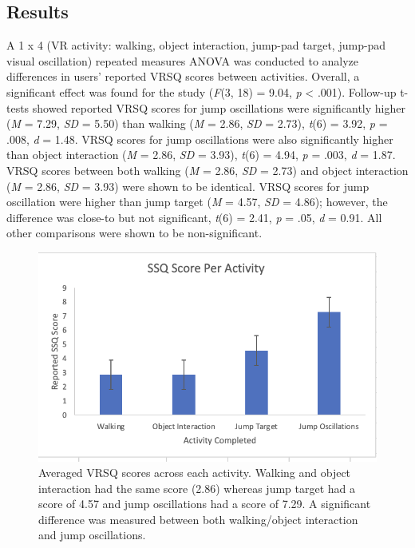 \documentclass[sigconf]{acmart}
\begin{document}
\subsection{Results}
A 1 x 4 (VR activity: walking, object interaction, jump-pad target, jump-pad visual oscillation) repeated measures ANOVA was conducted to analyze differences in users' reported VRSQ scores between activities. Overall, a significant effect was found for the study (\textit{F}(3, 18) = 9.04, \textit{p} < .001). Follow-up t-tests showed reported VRSQ scores for jump oscillations were significantly higher (\textit{M} = 7.29, \textit{SD} = 5.50) than walking (\textit{M} = 2.86, \textit{SD} = 2.73), \textit{t}(6) = 3.92, \textit{p} = .008, \textit{d} = 1.48. VRSQ scores for jump oscillations were also significantly higher than object interaction (\textit{M} = 2.86, \textit{SD} = 3.93), \textit{t}(6) = 4.94, \textit{p} = .003, \textit{d} = 1.87. VRSQ scores between both walking (\textit{M} = 2.86, \textit{SD} = 2.73) and object interaction (\textit{M} = 2.86, \textit{SD} = 3.93) were shown to be identical. VRSQ scores for jump oscillation were higher than jump target (\textit{M} = 4.57, \textit{SD} = 4.86); however, the difference was close-to but not significant, \textit{t}(6) = 2.41, \textit{p} = .05, \textit{d} = 0.91. All other comparisons were shown to be non-significant. 

\begin{figure}[h]
  \centering
  \includegraphics[width=\linewidth]{samples/C1 Graph.png}
  \caption{Averaged VRSQ scores across each activity. Walking and object interaction had the same score (2.86) whereas jump target had a score of 4.57 and jump oscillations had a score of 7.29. A significant difference was measured between both walking/object interaction and jump oscillations.}
\end{figure}
\end{document}
